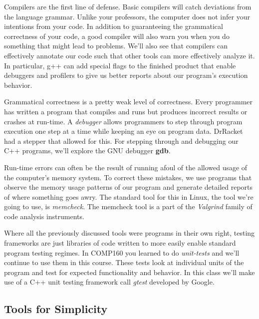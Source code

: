 \documentclass[nobib]{tufte-handout}
\begin{document}
Compilers are the first line of defense.  Basic compilers will catch deviations from the language grammar.  Unlike your professors, the computer does not infer your intentions from your code.  In addition to guaranteeing the grammatical correctness of your code, a good compiler will also warn you when you do something that might lead to problems.  We'll also see that compilers can effectively annotate our code such that other tools can more effectively analyze it. In particular, g++ can add special flags to the finished product that enable debuggers and profilers to give us better reports about our program's execution behavior.

Grammatical correctness is a pretty weak level of correctness. Every programmer has written a program that compiles and runs but produces incorrect results or crashes at run-time. A \textit{debugger} allows programmers to step through program execution one step at a time while keeping an eye on program data. DrRacket had a stepper that allowed for this. For stepping through and debugging our C++ programs, we'll explore the GNU debugger \textbf{gdb}.

Run-time errors can often be the result of running afoul of the allowed usage of the computer's memory system.  To correct these mistakes, we use programs that observe the memory usage patterns of our program and generate detailed reports of where something goes awry. The standard tool for this in Linux, the tool we're going to use, is \textit{memcheck}. The memcheck tool is a part of the \textit{Valgrind} family of code analysis instruments.

Where all the previously discussed tools were programs in their own right, testing frameworks are just libraries of code written to more easily enable standard program testing regimes.  In COMP160 you learned to do \textit{unit-tests} and we'll continue to use them in this course. These tests look at individual units of the program and test for expected functionality and behavior.  In this class we'll make use of a C++ unit testing framework call \textit{gtest} developed by Google.

\subsection{Tools for Simplicity}
\end{document}
